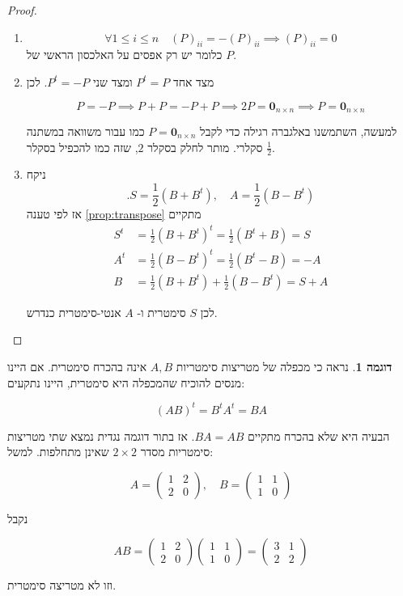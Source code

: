 \documentclass[12pt]{report}
\theoremstyle{plain}
\theoremstyle{definition}
\newtheorem{example}{דוגמה}[chapter]
\newcommand{\0}{\mathbf{0}}
\begin{document}
\begin{proof}\
\begin{enumerate}[label=\alph*.]
\item 
$$
\forall 1\leq i\leq n\quad(P)_{ii}=-(P)_{ii} \implies (P)_{ii}=0
$$
כלומר יש רק אפסים על האלכסון הראשי של
$P$.


\item
מצד אחד
$
P^t=P
$
ומצד שני
$
.P^t=-P
$
לכן

$$
P=-P \implies P+P=-P+P \implies 2P=\0_{n\times n} \implies P=\0_{n\times n}
$$

למעשה, השתמשנו באלגברה רגילה כדי לקבל 
$P=\0_{n\times n}$
כמו עבור משוואה במשתנה סקלרי. מותר לחלק בסקלר
$2$,
שזה כמו להכפיל בסקלר
$\frac{1}{2}$.


\item 
ניקח
$$
.S=\frac{1}{2}(B+B^t), \quad A=\frac{1}{2}(B-B^t)
$$
אז לפי טענה
\ref{prop:transpose}
מתקיים
$$
\begin{aligned}
S^t&=\frac{1}{2}(B+B^t)^t=\frac{1}{2}(B^t+B)=S \\
A^t&=\frac{1}{2}(B-B^t)^t=\frac{1}{2}(B^t-B)=-A \\
B&=\frac{1}{2}(B+B^t)+\frac{1}{2}(B-B^t)=S+A
\end{aligned}
$$

לכן
$S$
סימטרית ו-
$A$
אנטי-סימטרית כנדרש.


\end{enumerate}
\end{proof}

\begin{example}
נראה כי מכפלה של מטריצות סימטריות 
$A,B$
אינה בהכרח סימטרית. אם היינו מנסים להוכיח שהמכפלה היא סימטרית, היינו נתקעים:

$$
(AB)^t=B^tA^t=BA
$$

הבעיה היא שלא בהכרח מתקיים 
$BA=AB$.
אז בתור דוגמה נגדית נמצא שתי מטריצות סימטריות מסדר
$2\times 2$
שאינן מתחלפות. למשל:

$$
A=\begin{pmatrix}
1 &2 \\
2 &0
\end{pmatrix}, \quad
B=\begin{pmatrix}
1 &1 \\
1 &0
\end{pmatrix}
$$

נקבל

$$
AB=\begin{pmatrix}
1 &2 \\
2 &0
\end{pmatrix}\begin{pmatrix}
1 &1 \\
1 &0
\end{pmatrix}=\begin{pmatrix}
3 &1 \\
2 &2
\end{pmatrix}
$$

וזו לא מטריצה סימטרית.

\end{example}
\end{document}
